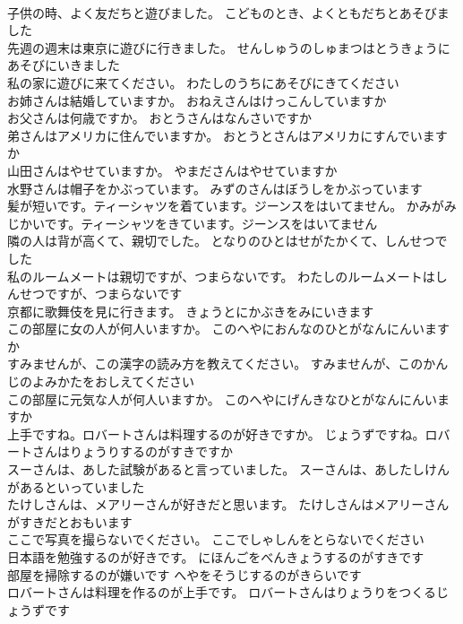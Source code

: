 \documentclass[8pt]{extreport}
\begin{document}
\begin{CJK}{UTF8}{min}
\\	子供の時、よく友だちと遊びました。	こどものとき、よくともだちとあそびました 
\\	先週の週末は東京に遊びに行きました。	せんしゅうのしゅまつはとうきょうにあそびにいきました 
\\	私の家に遊びに来てください。	わたしのうちにあそびにきてください 
\\	お姉さんは結婚していますか。	おねえさんはけっこんしていますか 
\\	お父さんは何歳ですか。	おとうさんはなんさいですか 
\\	弟さんはアメリカに住んでいますか。	おとうとさんはアメリカにすんでいますか 
\\	山田さんはやせていますか。	やまださんはやせていますか 
\\	水野さんは帽子をかぶっています。	みずのさんはぼうしをかぶっています 
\\	髪が短いです。ティーシャツを着ています。ジーンスをはいてません。	かみがみじかいです。ティーシャツをきています。ジーンスをはいてません 
\\	隣の人は背が高くて、親切でした。	となりのひとはせがたかくて、しんせつでした 
\\	私のルームメートは親切ですが、つまらないです。	わたしのルームメートはしんせつですが、つまらないです 
\\	京都に歌舞伎を見に行きます。	きょうとにかぶきをみにいきます 
\\	この部屋に女の人が何人いますか。	このへやにおんなのひとがなんにんいますか 
\\	すみませんが、この漢字の読み方を教えてください。	すみませんが、このかんじのよみかたをおしえてください 
\\	この部屋に元気な人が何人いますか。	このへやにげんきなひとがなんにんいますか 
\\	上手ですね。ロバートさんは料理するのが好きですか。	じょうずですね。ロバートさんはりょうりするのがすきですか 
\\	スーさんは、あした試験があると言っていました。	スーさんは、あしたしけんがあるといっていました 
\\	たけしさんは、メアリーさんが好きだと思います。	たけしさんはメアリーさんがすきだとおもいます 
\\	ここで写真を撮らないでください。	ここでしゃしんをとらないでください 
\\	日本語を勉強するのが好きです。	にほんごをべんきょうするのがすきです 
\\	部屋を掃除するのが嫌いです	へやをそうじするのがきらいです 
\\	ロバートさんは料理を作るのが上手です。	ロバートさんはりょうりをつくるじょうずです 

\end{CJK}
\end{document}
